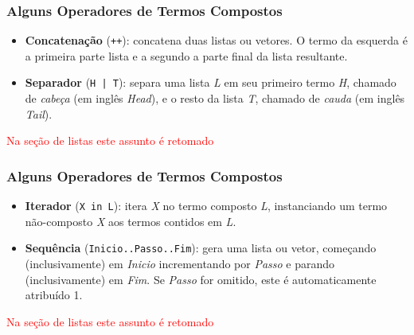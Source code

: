 \begin{frame}[fragile]
\frametitle{Alguns Operadores de Termos Compostos}
        
    \begin{block}{}
    	
	\begin{itemize}
        
    \item \textbf{Concatenação}\/ (\verb!++!): concatena duas listas ou vetores. O termo da esquerda
    é a primeira parte lista  e a segundo a parte final da lista resultante.

    \pause
     \item \textbf{Separador}\/ (\verb!H | T!): separa uma lista \emph{L} em seu primeiro termo \emph{H},  chamado de \textit{cabeça} (em inglês \textit{Head}), e o resto da lista \emph{T}, chamado de \textit{cauda} (em inglês \textit{Tail}).

    
	\end{itemize}
        
    \end{block}
    
    \textcolor{red}{Na seção  de listas este assunto é retomado}
    
\end{frame}



\begin{frame}[fragile]
\frametitle{Alguns Operadores de Termos Compostos}
        
    \begin{block}{}
    	
	\begin{itemize}
        
  \item \textbf{Iterador}\/ (\verb!X in L!): itera \textit{X} no termo composto \textit{L}, instanciando um termo   não-composto \emph{X} aos termos contidos em \emph{L}.
	\pause
            \item \textbf{Sequência }\/ (\verb!Inicio..Passo..Fim!): gera uma lista ou vetor, começando 
            (inclusivamente) em \textit{Inicio} incrementando por \textit{Passo} e parando (inclusivamente) em \textit{Fim}. Se \textit{Passo} for omitido, este é automaticamente atribuído 1. 
            
	\end{itemize}
        
    \end{block}
    
    \textcolor{red}{Na seção  de listas este assunto é retomado}
    
\end{frame}

